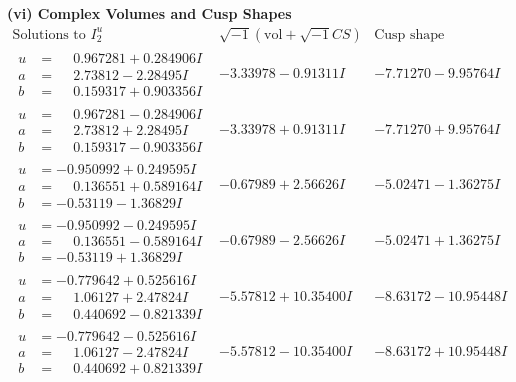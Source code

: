 \documentclass[1p]{elsarticle_modified}
\theoremstyle{definition}
\newcommand{\I}{\sqrt{-1}}
\begin{document}
\newpage\flushleft \textbf{(vi) Complex Volumes and Cusp Shapes}
$$\begin{array}{c|c|c}  
\text{Solutions to }I^u_{2}& \I (\text{vol} + \sqrt{-1}CS) & \text{Cusp shape}\\
 \hline 
\begin{aligned}
u &= \phantom{-}0.967281 + 0.284906 I \\
a &= \phantom{-}2.73812 - 2.28495 I \\
b &= \phantom{-}0.159317 + 0.903356 I\end{aligned}
 & -3.33978 - 0.91311 I & -7.71270 - 9.95764 I \\ \hline\begin{aligned}
u &= \phantom{-}0.967281 - 0.284906 I \\
a &= \phantom{-}2.73812 + 2.28495 I \\
b &= \phantom{-}0.159317 - 0.903356 I\end{aligned}
 & -3.33978 + 0.91311 I & -7.71270 + 9.95764 I \\ \hline\begin{aligned}
u &= -0.950992 + 0.249595 I \\
a &= \phantom{-}0.136551 + 0.589164 I \\
b &= -0.53119 - 1.36829 I\end{aligned}
 & -0.67989 + 2.56626 I & -5.02471 - 1.36275 I \\ \hline\begin{aligned}
u &= -0.950992 - 0.249595 I \\
a &= \phantom{-}0.136551 - 0.589164 I \\
b &= -0.53119 + 1.36829 I\end{aligned}
 & -0.67989 - 2.56626 I & -5.02471 + 1.36275 I \\ \hline\begin{aligned}
u &= -0.779642 + 0.525616 I \\
a &= \phantom{-}1.06127 + 2.47824 I \\
b &= \phantom{-}0.440692 - 0.821339 I\end{aligned}
 & -5.57812 + 10.35400 I & -8.63172 - 10.95448 I \\ \hline\begin{aligned}
u &= -0.779642 - 0.525616 I \\
a &= \phantom{-}1.06127 - 2.47824 I \\
b &= \phantom{-}0.440692 + 0.821339 I\end{aligned}
 & -5.57812 - 10.35400 I & -8.63172 + 10.95448 I \\ \hline\begin{aligned}

\end{aligned}
\end{array}$$
\end{document}
